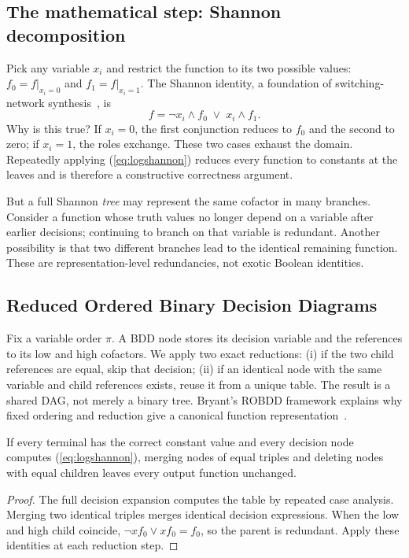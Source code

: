 \subsection{The mathematical step: Shannon decomposition}
Pick any variable $x_i$ and restrict the function to its two possible values: $f_0=f|_{x_i=0}$ and $f_1=f|_{x_i=1}$. The Shannon identity, a foundation of switching-network synthesis~\cite{shannon1949}, is
\begin{equation}\label{eq:logshannon}
 f=\neg x_i\land f_0\;\lor\;x_i\land f_1.
\end{equation}
Why is this true? If $x_i=0$, the first conjunction reduces to $f_0$ and the second to zero; if $x_i=1$, the roles exchange. These two cases exhaust the domain. Repeatedly applying (\ref{eq:logshannon}) reduces every function to constants at the leaves and is therefore a constructive correctness argument.

But a full Shannon \emph{tree} may represent the same cofactor in many branches. Consider a function whose truth values no longer depend on a variable after earlier decisions; continuing to branch on that variable is redundant. Another possibility is that two different branches lead to the identical remaining function. These are representation-level redundancies, not exotic Boolean identities.

\subsection{Reduced Ordered Binary Decision Diagrams}
Fix a variable order $\pi$. A BDD node stores its decision variable and the references to its low and high cofactors. We apply two exact reductions: (i) if the two child references are equal, skip that decision; (ii) if an identical node with the same variable and child references exists, reuse it from a unique table. The result is a shared DAG, not merely a binary tree. Bryant's ROBDD framework explains why fixed ordering and reduction give a canonical function representation~\cite{bryant1986}.

\begin{theorem}
If every terminal has the correct constant value and every decision node computes (\ref{eq:logshannon}), merging nodes of equal triples and deleting nodes with equal children leaves every output function unchanged.
\end{theorem}
\begin{proof}
The full decision expansion computes the table by repeated case analysis. Merging two identical triples merges identical decision expressions. When the low and high child coincide, $\neg x f_0\lor xf_0=f_0$, so the parent is redundant. Apply these identities at each reduction step.\end{proof}

